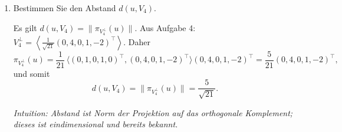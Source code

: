 \documentclass[11pt, a4paper]{article}
\begin{document}
\begin{enumerate}
  \item Bestimmen Sie den Abstand $d(u,V_4)$.
  \begin{framed}
  Es gilt $d(u,V_4)=\|\pi_{V_4^\perp}(u)\|$. Aus Aufgabe 4: 
  $V_4^\perp=\left\langle \frac{1}{\sqrt{21}}(0,4,0,1,-2)^{\top}\right\rangle$.
  Daher
  \[
  \pi_{V_4^\perp}(u)=\frac{1}{21}\,\langle (0,1,0,1,0)^{\top},(0,4,0,1,-2)^{\top}\rangle
  (0,4,0,1,-2)^{\top}=\frac{5}{21}(0,4,0,1,-2)^{\top},
  \]
  und somit
  \[
  d(u,V_4)=\bigl\|\pi_{V_4^\perp}(u)\bigr\|=\frac{5}{\sqrt{21}}.
  \]

  \medskip\noindent\textit{Intuition: Abstand ist Norm der Projektion auf das orthogonale Komplement; dieses ist eindimensional und bereits bekannt.}
  \end{framed}


\end{enumerate}
\end{document}

